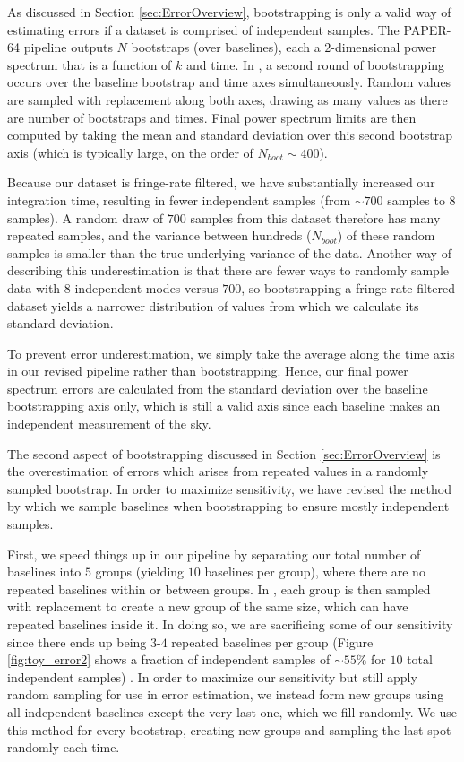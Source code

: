 \documentclass[preprint2,numberedappendix,tighten]{aastex6}  %
\begin{document}
As discussed in Section \ref{sec:ErrorOverview}, bootstrapping is only a valid way of estimating errors if a dataset is comprised of independent samples. The PAPER-64 pipeline outputs $N$ bootstraps (over baselines), each a $2$-dimensional power spectrum that is a function of $k$ and time. In \citet{ali_et_al2015}, a second round of bootstrapping occurs over the baseline bootstrap and time axes simultaneously. Random values are sampled with replacement along both axes, drawing as many values as there are number of bootstraps and times. Final power spectrum limits are then computed by taking the mean and standard deviation over this second bootstrap axis (which is typically large, on the order of $N_{boot} \sim 400$). 

Because our dataset is fringe-rate filtered, we have substantially increased our integration time, resulting in fewer independent samples (from $\sim700$ samples to $8$ samples). A random draw of $700$ samples from this dataset therefore has many repeated samples, and the variance between hundreds ($N_{boot}$) of these random samples is smaller than the true underlying variance of the data. Another way of describing this underestimation is that there are fewer ways to randomly sample data with $8$ independent modes versus $700$, so bootstrapping a fringe-rate filtered dataset yields a narrower distribution of values from which we calculate its standard deviation.

To prevent error underestimation, we simply take the average along the time axis in our revised pipeline rather than bootstrapping. Hence, our final power spectrum errors are calculated from the standard deviation over the baseline bootstrapping axis only, which is still a valid axis since each baseline makes an independent measurement of the sky.

The second aspect of bootstrapping discussed in Section \ref{sec:ErrorOverview} is the overestimation of errors which arises from repeated values in a randomly sampled bootstrap. In order to maximize sensitivity, we have revised the method by which we sample baselines when bootstrapping to ensure mostly independent samples.

First, we speed things up in our pipeline by separating our total number of baselines into $5$ groups (yielding $10$ baselines per group), where there are no repeated baselines within or between groups. In \citet{ali_et_al2015}, each group is then sampled with replacement to create a new group of the same size, which can have repeated baselines inside it. In doing so, we are sacrificing some of our sensitivity since there ends up being $3$-$4$ repeated baselines per group (Figure \ref{fig:toy_error2} shows a fraction of independent samples of $\sim55\%$ for $10$ total independent samples) . In order to maximize our sensitivity but still apply random sampling for use in error estimation, we instead form new groups using all independent baselines except the very last one, which we fill randomly. We use this method for every bootstrap, creating new groups and sampling the last spot randomly each time.
\end{document}
